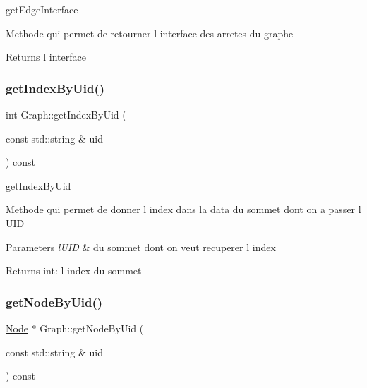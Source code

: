 get\+Edge\+Interface 

Methode qui permet de retourner l interface des arretes du graphe

\begin{DoxyReturn}{Returns}
l interface 
\end{DoxyReturn}
\mbox{\label{class_graph_a2d8d8d9edb8a496d5c252132cdbbbc08}} 
\subsubsection{\texorpdfstring{get\+Index\+By\+Uid()}{getIndexByUid()}}
{\footnotesize\ttfamily int Graph\+::get\+Index\+By\+Uid (\begin{DoxyParamCaption}\item[{const std\+::string \&}]{uid }\end{DoxyParamCaption}) const}



get\+Index\+By\+Uid 

Methode qui permet de donner l index dans la data du sommet dont on a passer l U\+ID


\begin{DoxyParams}{Parameters}
{\em l\textquotesingle{}\+U\+ID} & du sommet dont on veut recuperer l index \\
\hline
\end{DoxyParams}
\begin{DoxyReturn}{Returns}
int\+: l index du sommet 
\end{DoxyReturn}
\mbox{\label{class_graph_aa9fa7bf3cf75a4239504607a442aebba}} 
\subsubsection{\texorpdfstring{get\+Node\+By\+Uid()}{getNodeByUid()}}
{\footnotesize\ttfamily \mbox{\hyperlink{class_node}{Node}} $\ast$ Graph\+::get\+Node\+By\+Uid (\begin{DoxyParamCaption}\item[{const std\+::string \&}]{uid }\end{DoxyParamCaption}) const}



